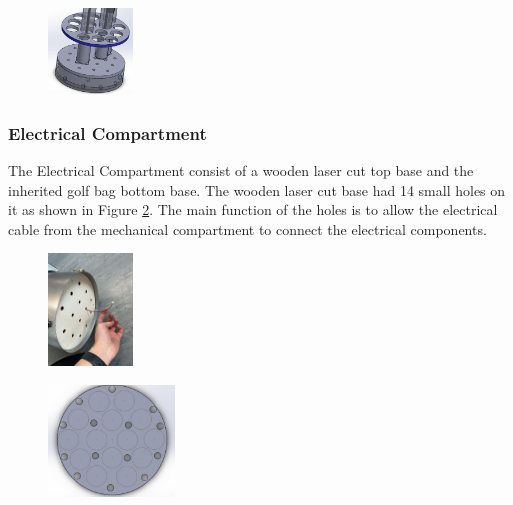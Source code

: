 \documentclass[11pt,landscape]{article}
\begin{document}
\begin{multicols}{3}
    \begin{figure}[H]
        \begin{center}
            \includegraphics[width=0.2\textwidth]{Figure7.jpg}
            \label{fig:TOP}
        \end{center}
    \end{figure}
    
    \subsubsection{Electrical Compartment}
    The Electrical Compartment consist of a wooden laser cut top base and the
    inherited golf bag bottom base. The wooden laser cut base had 14 small holes
    on it as shown in Figure \ref{fig:ELECBASE}. The main function of the holes
    is to allow the electrical cable from the mechanical compartment to connect
    the electrical components.
    
    \begin{figure}[H]
        \begin{center}
            \includegraphics[width=0.2\textwidth]{Figure8.jpg}
            \label{fig:ELECBASE}
        \end{center}
    \end{figure}
    
    
    
    \begin{figure}[H]
        \begin{center}
            \includegraphics[width=0.3\textwidth]{Figure9.jpg}
            \label{fig:ELEC}
        \end{center}
    \end{figure}
\end{multicols}
\end{document}
